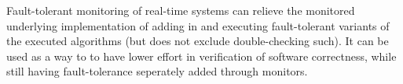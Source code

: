 Fault-tolerant monitoring of real-time systems can relieve the
monitored underlying implementation of adding in and executing
fault-tolerant variants of the executed algorithms (but does not
exclude double-checking such). It can be used as a way to to have
lower effort in verification of software correctness, while still
having fault-tolerance seperately added through monitors.
